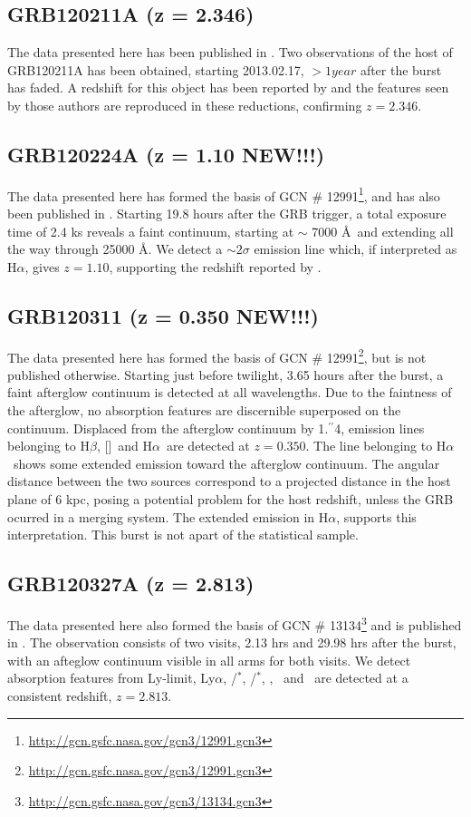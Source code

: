 \documentclass[iop, twocolappendix, numberedappendix, tighten, appendixfloats]{emulateapj}
\newcommand{\farc}{\hbox{$.\!\!^{\prime\prime}$}}
\newcommand{\lya}{Ly$\alpha$}
\newcommand{\hb}{H$\beta$}
\newcommand{\ha}{H$\alpha$}
\newcommand{\oiii}{[\ion{O}{3}]}
\newcommand{\feii}{\ion{Fe}{2}}
\newcommand{\cii}{\ion{C}{2}}
\newcommand{\mgii}{\ion{Mg}{2}}
\newcommand{\ali}{\ion{Al}{1}}
\newcommand{\SIii}{\ion{Si}{2}}
\begin{document}
	\subsection{GRB120211A (z = 2.346)}
	The data presented here has been published in \citet{Kruhler2015}. Two
	observations of the host of GRB120211A has been obtained, starting 2013.02.17,
	$> 1 year$ after the burst has faded. A redshift for this object has been
	reported by \citet{Kruhler2015} and the features seen by those authors are
	reproduced in these reductions, confirming $z =	2.346$.

	\subsection{GRB120224A (z = 1.10 NEW!!!)}
	The data presented here has formed the basis of GCN \#
	12991\footnote{\url{http://gcn.gsfc.nasa.gov/gcn3/12991.gcn3}}, and has also
	been published in \citet{Kruhler2015}. Starting 19.8 hours after the GRB
	trigger, a total exposure time of 2.4 ks reveals a faint continuum, starting at
	$\sim$ 7000 \AA~and extending all the way through 25000 \AA. We detect a $\sim
	2 \sigma$ emission line which, if interpreted as \ha, gives $z = 1.10$,
	supporting the redshift reported by \citet{Kruhler2015}.

	\subsection{GRB120311 (z = 0.350 NEW!!!)}
	The data presented here has formed the basis of GCN \#
	12991\footnote{\url{http://gcn.gsfc.nasa.gov/gcn3/12991.gcn3}}, but is not
	published otherwise. Starting just before twilight, 3.65 hours after the burst,
	a faint afterglow continuum is detected at all wavelengths. Due to the
	faintness of the afterglow, no absorption features are discernible superposed
	on the continuum. Displaced from the afterglow continuum by 1\farc4, emission
	lines belonging to \hb, \oiii~and \ha~are detected at $z = 0.350$. The line
	belonging to \ha~shows some extended emission toward the afterglow continuum.
	The angular distance between the two sources correspond to a projected distance
	in the host plane of 6 kpc, posing a potential problem for the host redshift,
	unless the GRB ocurred in a merging system. The extended emission in \ha,
	supports this interpretation. This burst is not apart of the statistical sample.

	\subsection{GRB120327A (z = 2.813)}
	The data presented here also formed the basis of GCN \#
	13134\footnote{\url{http://gcn.gsfc.nasa.gov/gcn3/13134.gcn3}} and is published
	in \citet{DElia2014}. The observation consists of two visits, 2.13 hrs and
	29.98 hrs after the burst, with an afteglow continuum visible in all arms for
	both visits. We detect absorption features from Ly-limit, \lya, \cii/\cii$^*$,
	\SIii/\SIii$^*$, \ali, \feii ~and \mgii ~are detected at a consistent redshift,
	$z = 2.813$.
\end{document}
